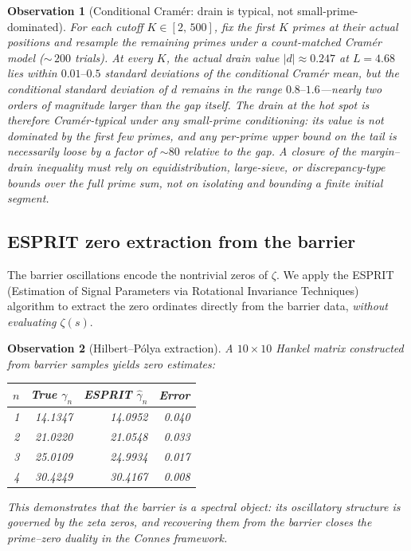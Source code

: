\documentclass[11pt,a4paper]{article}
\newtheorem{observation}{Observation}[section]
\begin{document}
\begin{observation}[Conditional Cram\'er: drain is typical, not small-prime-dominated]\label{obs:conditional-cramer}
For each cutoff $K \in [2,\, 500]$, fix the first $K$ primes at their actual positions and resample the remaining primes under a count-matched Cram\'er model ($\sim\,200$ trials). At every $K$, the actual drain value $|d| \approx 0.247$ at $L=4.68$ lies within $0.01\text{--}0.5$ standard deviations of the conditional Cram\'er mean, but the conditional standard deviation of $d$ remains in the range $0.8\text{--}1.6$---nearly two orders of magnitude larger than the gap itself. The drain at the hot spot is therefore \emph{Cram\'er-typical} under any small-prime conditioning: its value is not dominated by the first few primes, and any per-prime upper bound on the tail is necessarily loose by a factor of ${\sim}80$ relative to the gap. A closure of the margin--drain inequality must rely on equidistribution, large-sieve, or discrepancy-type bounds over the full prime sum, not on isolating and bounding a finite initial segment.
\end{observation}

\subsection{ESPRIT zero extraction from the barrier}

The barrier oscillations encode the nontrivial zeros of $\zeta$. We apply the ESPRIT (Estimation of Signal Parameters via Rotational Invariance Techniques) algorithm to extract the zero ordinates directly from the barrier data, \emph{without evaluating $\zeta(s)$}.

\begin{observation}[Hilbert--P\'olya extraction]
A $10 \times 10$ Hankel matrix constructed from barrier samples yields zero estimates:
\begin{center}
\begin{tabular}{rrrr}
\toprule
$n$ & True $\gamma_n$ & ESPRIT $\hat{\gamma}_n$ & Error \\
\midrule
1 & 14.1347 & 14.0952 & 0.040 \\
2 & 21.0220 & 21.0548 & 0.033 \\
3 & 25.0109 & 24.9934 & 0.017 \\
4 & 30.4249 & 30.4167 & 0.008 \\
\bottomrule
\end{tabular}
\end{center}
This demonstrates that the barrier is a spectral object: its oscillatory structure is governed by the zeta zeros, and recovering them from the barrier closes the prime--zero duality in the Connes framework.
\end{observation}
\end{document}
